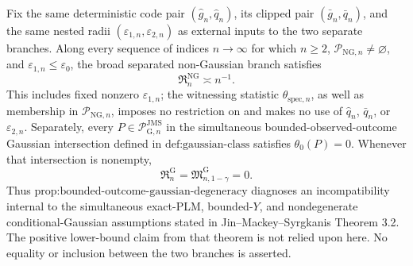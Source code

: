 Fix the same deterministic code pair \((\widehat g_n,\widehat q_n)\), its clipped pair \((\bar g_n,\bar q_n)\), and the same nested radii \((\varepsilon_{1,n},\varepsilon_{2,n})\) as external inputs to the two separate branches. Along every sequence of indices \(n\to\infty\) for which \(n\ge2\), \(\mathcal P_{\mathrm{NG},n}\neq\varnothing\), and \(\varepsilon_{1,n}\le\varepsilon_0\), the broad separated non-Gaussian branch satisfies
\[
 \mathfrak R_n^{\mathrm{NG}}\asymp n^{-1}.
\]
This includes fixed nonzero \(\varepsilon_{1,n}\); the witnessing statistic \(\widehat\theta_{\mathrm{spec},n}\), as well as membership in \(\mathcal P_{\mathrm{NG},n}\), imposes no restriction on and makes no use of \(\widehat q_n\), \(\bar q_n\), or \(\varepsilon_{2,n}\). Separately, every \(P\in\mathcal P_{\mathrm G,n}^{\mathrm{JMS}}\) in the simultaneous bounded-observed-outcome Gaussian intersection defined in \(\text{def:gaussian-class}\) satisfies \(\theta_0(P)=0\). Whenever that intersection is nonempty,
\[
 \mathfrak R_n^{\mathrm G}
 =\mathfrak M_{n,1-\gamma}^{\mathrm G}
 =0.
\]
Thus \(\text{prop:bounded-outcome-gaussian-degeneracy}\) diagnoses an incompatibility internal to the simultaneous exact-PLM, bounded-\(Y\), and nondegenerate conditional-Gaussian assumptions stated in Jin--Mackey--Syrgkanis Theorem 3.2. The positive lower-bound claim from that theorem is not relied upon here. No equality or inclusion between the two branches is asserted.